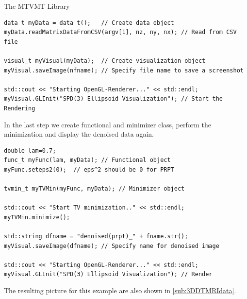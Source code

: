 \begin{chapter}{The MTVMT Library}
\cppinline
\begin{lstlisting}[label=code:tut3_rendernoisyimg,caption={Data input and displaying the noisy data}]
data_t myData = data_t();   // Create data object
myData.readMatrixDataFromCSV(argv[1], nz, ny, nx); // Read from CSV file

visual_t myVisual(myData);  // Create visualization object
myVisual.saveImage(nfname); // Specify file name to save a screenshot

std::cout << "Starting OpenGL-Renderer..." << std::endl;
myVisual.GLInit("SPD(3) Ellipsoid Visualization"); // Start the Rendering
\end{lstlisting}

In the last step we create functional and minimizer class, perform the minimization and display the denoised data again.

\cppinline
\begin{lstlisting}[label=code:tut3_rendernoisyimg,caption={Minimization and final rendering}]
double lam=0.7;
func_t myFunc(lam, myData); // Functional object
myFunc.seteps2(0);  // eps^2 should be 0 for PRPT

tvmin_t myTVMin(myFunc, myData); // Minimizer object

std::cout << "Start TV minimization.." << std::endl;
myTVMin.minimize();

std::string dfname = "denoised(prpt)_" + fname.str();
myVisual.saveImage(dfname); // Specify name for denoised image

std::cout << "Starting OpenGL-Renderer..." << std::endl;
myVisual.GLInit("SPD(3) Ellipsoid Visualization"); // Render
\end{lstlisting}

The resulting picture for this example are also shown in \ref{sub:3DDTMRIdata}.







\end{chapter}
